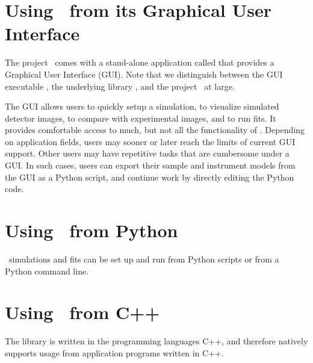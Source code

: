 \section{Using \BornAgain\ from its Graphical User Interface}

The project \BornAgain\ comes with a stand-alone application called 
that provides a Graphical User Interface (GUI).
Note that we distinguish between the GUI executable ,
the underlying library , and the project \BornAgain\ at large.

The GUI allows users to quickly setup a simulation, to visualize simulated
detector images, to compare with experimental images, and to run fits.
It provides comfortable access to much, but not all the functionality
of .
Depending on application fields,
users may sooner or later reach the limits of current GUI support.
Other users may have repetitive tasks that are cumbersome under a GUI.
In such cases, users can export their sample and instrument models from
the GUI as a Python script,
and continue work by directly editing the Python code.


\section{Using \BornAgain\ from Python}

\BornAgain\ simulations and fits can be set up and run from Python scripts
or from a Python command line.


\section{Using \BornAgain\ from C++}

The library 
%
%
is written in the programming languages C++,
and therefore natively supports usage from application programs written in C++.


